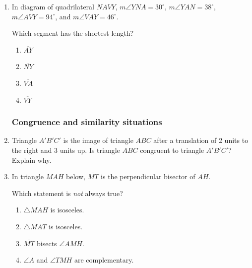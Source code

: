 \documentclass[12pt, oneside]{article}
\begin{document}
\begin{enumerate}[itemsep=0cm]
\item In diagram of quadrilateral $NAVY$, $m\angle YNA = 30^\circ$, $m\angle YAN = 38^\circ$,\\ $m\angle AVY = 94^\circ$, and $m\angle VAY = 46^\circ$.
\begin{center}
  \end{center}
Which segment has the shortest length?
  \begin{multicols}{2}
  \begin{enumerate}
    \item $\overline{AY}$
    \item $\overline{NY}$
    \item $\overline{VA}$
    \item $\overline{VY}$
  \end{enumerate}
  \end{multicols}

\subsubsection*{Congruence and similarity situations}
\item Triangle $A'B'C'$ is the image of triangle $ABC$ after a translation of 2 units to the right and 3 units up. Is triangle $ABC$ congruent to triangle $A'B'C'$? Explain why.
  
\item In triangle $MAH$ below, $\overline{MT}$ is the perpendicular bisector of $\overline{AH}$.
  \begin{center}
  \end{center}
Which statement is \emph{not} always true?
  \begin{enumerate}
    \item $\triangle MAH$ is isosceles.
    \item $\triangle MAT$ is isosceles.
    \item $\overline{MT}$ bisects $\angle AMH$.
    \item $\angle A$ and $\angle TMH$ are complementary.
  \end{enumerate}


\end{enumerate}
\end{document}
